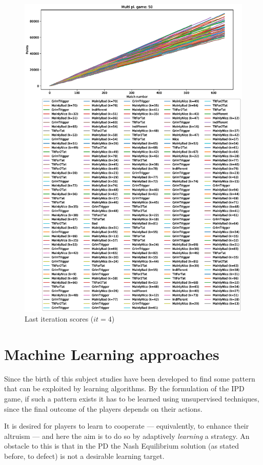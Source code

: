 \documentclass[journal,10pt,twoside]{IEEEtran}
\begin{document}
\begin{figure}[!ht]
    \centering
    \includegraphics[width=1\columnwidth]{../img/cipdmp-incr/cipdmp-scores-increasing-pop-50-r4}
    \caption{Last iteration scores ($it=4$)}
    \label{fig:incrCLI}
\end{figure}

\section{Machine Learning approaches} \label{s:ml}
Since the birth of this subject studies have been developed to find some pattern that can be exploited by learning algorithms.
By the formulation of the IPD game, if such a pattern exists it has to be learned using unsupervised techniques, since the final outcome of the players depends on their actions.

It is desired for players to learn to cooperate --- equivalently, to enhance their altruism --- and here the aim is to do so by adaptively \textit{learning} a strategy. An obstacle to this is that in the PD the Nash Equilibrium solution (as stated before, to defect) is not a desirable learning target. \cite{coopSeqRL}
\end{document}
